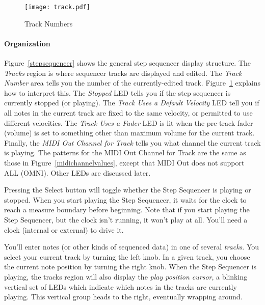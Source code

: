\documentclass{article}
\begin{document}
\begin{figure}
\texttt{[image: track.pdf]}
\vspace{-2em}\caption{\small Track Numbers}
\label{tracknumber}
\end{figure}

\paragraph{Organization} Figure~\ref{stepsequencer} shows the general step sequencer display structure.  The {\it Tracks} region is where sequencer tracks are displayed and edited.  The {\it Track Number} area tells you the number of the currently-edited track.  Figure~\ref{tracknumber} explains how to interpret this.  The {\it Stopped} LED tells you if the step sequencer is currently stopped (or playing).  The {\it Track Uses a Default Velocity} LED tell you if all notes in the current track are fixed to the same velocity, or permitted to use different velocities.  The {\it Track Uses a Fader} LED is lit when the pre-track fader (volume) is set to something other than maximum volume for the current track.   Finally, the {\it MIDI Out Channel for Track} tells you what channel the current track is playing.  The patterns for the MIDI Out Channel for Track are the same as those in Figure~\ref{midichannelvalues}, except that MIDI Out does not support ALL (OMNI).  Other LEDs are discussed later.

Pressing the Select button will toggle whether the Step Sequencer is playing or stopped.  When you start playing the Step Sequencer, it waits for the clock to reach a measure boundary before beginning.  Note that if you start playing the Step Sequencer, but the clock isn't running, it won't play at all.  You'll need a clock (internal or external) to drive it.

You'll enter notes (or other kinds of sequenced data) in one of several {\it tracks}. You select your current track by turning the left knob.  In a given track, you choose the current note position by turning the right knob.  When the Step Sequencer is playing, the  tracks region will also display the {\it play position cursor}, a blinking vertical set of LEDs which indicate which notes in the tracks are currently playing.  This vertical group heads to the right, eventually wrapping around. 
\end{document}
